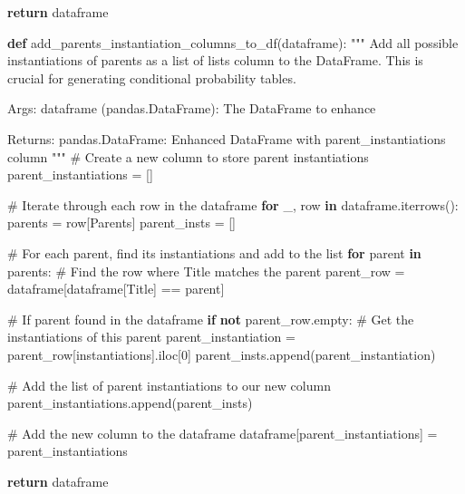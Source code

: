 \documentclass[
  11pt,
  letterpaper,
]{book}
\newenvironment{Shaded}{\begin{snugshade}}{\end{snugshade}}
\newcommand{\CommentTok}[1]{\textcolor[rgb]{0.37,0.37,0.37}{#1}}
\newcommand{\ControlFlowTok}[1]{\textcolor[rgb]{0.00,0.23,0.31}{\textbf{#1}}}
\newcommand{\DecValTok}[1]{\textcolor[rgb]{0.68,0.00,0.00}{#1}}
\newcommand{\KeywordTok}[1]{\textcolor[rgb]{0.00,0.23,0.31}{\textbf{#1}}}
\newcommand{\NormalTok}[1]{\textcolor[rgb]{0.00,0.23,0.31}{#1}}
\newcommand{\OperatorTok}[1]{\textcolor[rgb]{0.37,0.37,0.37}{#1}}
\newcommand{\StringTok}[1]{\textcolor[rgb]{0.13,0.47,0.30}{#1}}
\begin{document}
\begin{Shaded}
\begin{Highlighting}[]
    \ControlFlowTok{return}\NormalTok{ dataframe}

\KeywordTok{def}\NormalTok{ add\_parents\_instantiation\_columns\_to\_df(dataframe):}
    \CommentTok{"""}
\CommentTok{    Add all possible instantiations of parents as a list of lists column to the DataFrame.}
\CommentTok{    This is crucial for generating conditional probability tables.}

\CommentTok{    Args:}
\CommentTok{        dataframe (pandas.DataFrame): The DataFrame to enhance}

\CommentTok{    Returns:}
\CommentTok{        pandas.DataFrame: Enhanced DataFrame with parent\_instantiations column}
\CommentTok{    """}
    \CommentTok{\# Create a new column to store parent instantiations}
\NormalTok{    parent\_instantiations }\OperatorTok{=}\NormalTok{ []}

    \CommentTok{\# Iterate through each row in the dataframe}
    \ControlFlowTok{for}\NormalTok{ \_, row }\KeywordTok{in}\NormalTok{ dataframe.iterrows():}
\NormalTok{        parents }\OperatorTok{=}\NormalTok{ row[}\StringTok{\textquotesingle{}Parents\textquotesingle{}}\NormalTok{]}
\NormalTok{        parent\_insts }\OperatorTok{=}\NormalTok{ []}

        \CommentTok{\# For each parent, find its instantiations and add to the list}
        \ControlFlowTok{for}\NormalTok{ parent }\KeywordTok{in}\NormalTok{ parents:}
            \CommentTok{\# Find the row where Title matches the parent}
\NormalTok{            parent\_row }\OperatorTok{=}\NormalTok{ dataframe[dataframe[}\StringTok{\textquotesingle{}Title\textquotesingle{}}\NormalTok{] }\OperatorTok{==}\NormalTok{ parent]}

            \CommentTok{\# If parent found in the dataframe}
            \ControlFlowTok{if} \KeywordTok{not}\NormalTok{ parent\_row.empty:}
                \CommentTok{\# Get the instantiations of this parent}
\NormalTok{                parent\_instantiation }\OperatorTok{=}\NormalTok{ parent\_row[}\StringTok{\textquotesingle{}instantiations\textquotesingle{}}\NormalTok{].iloc[}\DecValTok{0}\NormalTok{]}
\NormalTok{                parent\_insts.append(parent\_instantiation)}

        \CommentTok{\# Add the list of parent instantiations to our new column}
\NormalTok{        parent\_instantiations.append(parent\_insts)}

    \CommentTok{\# Add the new column to the dataframe}
\NormalTok{    dataframe[}\StringTok{\textquotesingle{}parent\_instantiations\textquotesingle{}}\NormalTok{] }\OperatorTok{=}\NormalTok{ parent\_instantiations}

    \ControlFlowTok{return}\NormalTok{ dataframe}
\end{Highlighting}
\end{Shaded}
\end{document}
